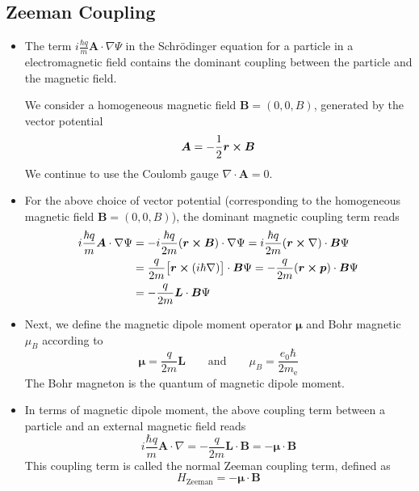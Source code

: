 \documentclass[11pt, a4paper]{article}
\renewcommand{\div}{\nabla \cdot}
\renewcommand{\grad}{\nabla}
\newcommand{\eqtext}[1]{\qquad \text{#1} \qquad}
\newcommand{\Schro}{Schr\"{o}dinger\xspace}
\renewcommand{\vec}[1]{\bm{#1}}  %
\renewcommand{\r}{\vec{r}}  %
\renewcommand{\L}{\vec{L}}  %
\newcommand{\A}{\vec{A}}  %
\newcommand{\B}{\vec{B}}  %
\newcommand{\m}{\vec{\mu}}  %
\renewcommand{\P}{\Psi}  %
\begin{document}
\subsection{Zeeman Coupling}
\begin{itemize}
	\item The term $ i \frac{\hbar q}{m}\A \cdot \grad \P $ in the \Schro equation for a particle in a electromagnetic field contains the dominant coupling between the particle and the magnetic field. 
	
	We consider a homogeneous magnetic field $ \vec{B} = (0, 0, B) $, generated by the vector potential
	\begin{equation*}
		\A = -\frac{1}{2}\r \cross \vec{B}
	\end{equation*}
	We continue to use the Coulomb gauge $ \div \A = 0 $. 
	
	\item For the above choice of vector potential (corresponding to the homogeneous magnetic field $ \vec{B} = (0, 0, B) $), the dominant magnetic coupling term reads
	\begin{align*}
		i \frac{\hbar q}{m}\A \cdot \grad \P &= - i\frac{\hbar q}{2m}(\r \cross \vec{B}) \cdot \grad \P = i\frac{\hbar q}{2m}(\r \cross \nabla) \cdot \vec{B} \P\\
		& = \frac{q}{2m}\big[\r \cross (i\hbar \nabla)\big] \cdot \vec{B} \P = - \frac{q}{2m}(\r \cross \vec{p}) \cdot \vec{B} \P \\
		& = - \frac{q}{2m}\vec{L} \cdot \B \P
	\end{align*}
	
	\item Next, we define the magnetic dipole moment operator $ \m $ and Bohr magnetic $ \mu_{B} $ according to
	\begin{equation*}
		\m = \frac{q}{2m}\L \eqtext{and} \mu_{B} = \frac{e_{0}\hbar}{2m_{\text{e}}}
	\end{equation*}
	The Bohr magneton is the quantum of magnetic dipole moment. 
	
	\item In terms of magnetic dipole moment, the above coupling term between a particle and an external magnetic field reads
	\begin{equation*}
		i \frac{\hbar q}{m}\A \cdot \grad = - \frac{q}{2m}\vec{L} \cdot \B = - \m \cdot \B
	\end{equation*}
	This coupling term is called the normal Zeeman coupling term, defined as
	\begin{equation*}
		H_{\text{Zeeman}} = - \m \cdot \B
	\end{equation*}
	

\end{itemize}
\end{document}
